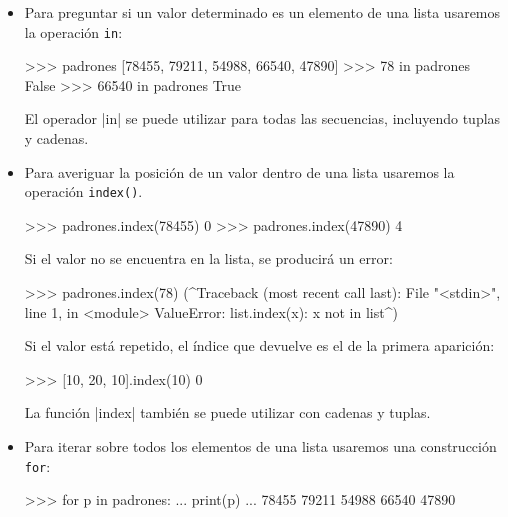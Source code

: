 \begin{itemize}
\item Para preguntar si un valor determinado es un elemento de una lista
usaremos la operación \lstinline+in+:

\begin{codigo-python-sn}
>>> padrones
[78455, 79211, 54988, 66540, 47890]
>>> 78 in padrones
False
>>> 66540 in padrones
True
\end{codigo-python-sn}

\begin{observacion}
El operador |in| se puede utilizar para todas las secuencias, incluyendo
tuplas y cadenas.
\end{observacion}

\item Para averiguar la posición de un valor dentro de una lista usaremos
la operación \lstinline+index()+.

\begin{codigo-python-sn}
>>> padrones.index(78455)
0
>>> padrones.index(47890)
4
\end{codigo-python-sn}

\begin{atencion}
Si el valor no se encuentra en la lista, se producirá un error:

\begin{codigo-python-sn}
>>> padrones.index(78)
(^Traceback (most recent call last):
  File "<stdin>", line 1, in <module>
ValueError: list.index(x): x not in list^)
\end{codigo-python-sn}
\end{atencion}

Si el valor está repetido, el índice que devuelve es el de la primera aparición:

\begin{codigo-python-sn}
>>> [10, 20, 10].index(10)
0
\end{codigo-python-sn}

\begin{observacion}
La función |index| también se puede utilizar con cadenas y tuplas.
\end{observacion}

\item Para iterar sobre todos los elementos de una lista usaremos una
construcción \lstinline+for+:

\begin{codigo-python-sn}
>>> for p in padrones:
...     print(p)
...
78455
79211
54988
66540
47890
\end{codigo-python-sn}


\end{itemize}
